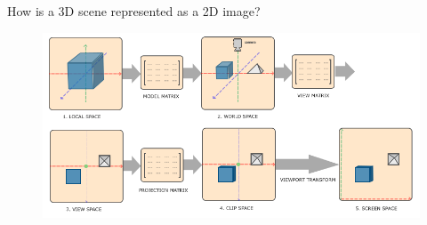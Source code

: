 \documentclass[10pt]{beamer}
\begin{document}
\begin{frame}{How is a 3D scene represented as a 2D image?}

  \begin{figure}
    \includegraphics[width=\textwidth]{learnopengl_coordinate_systems.png}
  \end{figure}



\end{frame}
\end{document}
